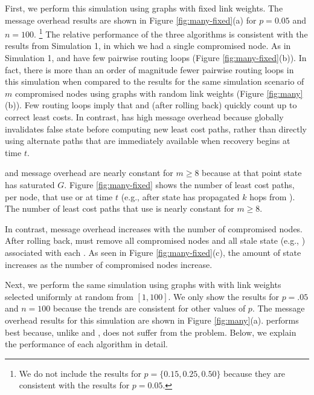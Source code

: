 First, we perform this simulation using \er graphs with fixed link weights.  The message overhead results are shown in Figure \ref{fig:many-fixed}(a) for $p=0.05$ and $n=100$. 
{\footnote {\small We do not include the results for $p=\{0.15,0.25,0.50\}$ because they are consistent with the results for $p=0.05$.}}
The relative performance of the three algorithms is consistent with the results from Simulation 1, in which we had a single compromised node.
As in Simulation 1, \second and \cpr have few pairwise routing loops (Figure \ref{fig:many-fixed}(b)).  In fact, there is more than an order of magnitude fewer pairwise routing 
loops in this simulation
when compared to the results for the same simulation scenario of $m$ compromised nodes using \er graphs with random link weights (Figure \ref{fig:many}(b)).
Few routing loops imply that \second and \cpr (after rolling back) quickly count up to correct least costs.
In contrast, \purge has high message overhead because \purge globally invalidates false state before computing new least cost paths, rather than directly using alternate paths that 
are immediately available when recovery begins at time $t$. 

\second and \purge message overhead are nearly constant for $m \geq 8$ because at that point \badvector state has saturated $G$.
Figure \ref{fig:many-fixed} shows the number of least cost paths, per node,
that use \badvector or \oldvector at time $t$ (e.g., after \badvector state has propagated $k$ hops from \bads).  The number of least cost paths that use \badvector is nearly constant for $m \geq 8$. 

In contrast, \cpr message overhead increases with the number of compromised nodes.  After rolling back, \cpr must remove all compromised nodes and all
stale state (e.g., \oldvectors) associated with each \bads. As seen in Figure \ref{fig:many-fixed}(c), 
the amount of \oldvector state increases as the number of compromised nodes increase. 

Next, we perform the same simulation using \er graphs with with link weights selected uniformly at random from $[1,100]$. We only show the results for $p=.05$ and $n=100$ because the 
trends are consistent for other values of $p$.
The message overhead results for this simulation are shown in Figure \ref{fig:many}(a). \purge performs best because, unlike \second and \cprs, \purge does not suffer 
from the \infinity problem.  Below, we explain the performance of each algorithm in detail.

